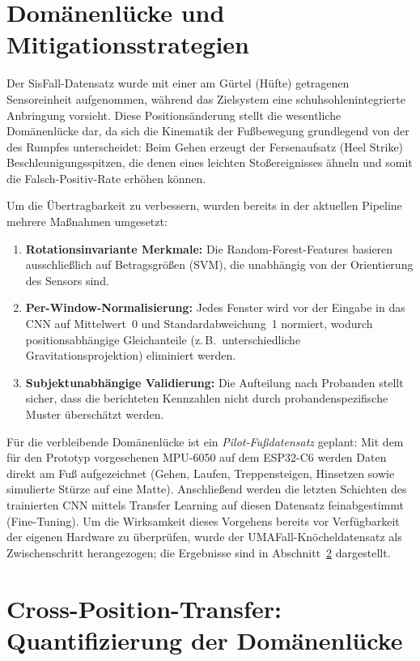\documentclass[11pt,a4paper,oneside]{report}
\begin{document}
\section{Domänenlücke und Mitigationsstrategien}
\label{sec:domain}

Der SisFall-Datensatz wurde mit einer am Gürtel (Hüfte) getragenen
Sensoreinheit aufgenommen, während das Zielsystem eine
schuhsohlenintegrierte Anbringung vorsieht. Diese Positionsänderung
stellt die wesentliche Domänenlücke dar, da sich die Kinematik der
Fußbewegung grundlegend von der des Rumpfes unterscheidet: Beim Gehen
erzeugt der Fersenaufsatz (Heel Strike) Beschleunigungsspitzen, die
denen eines leichten Stoßereignisses ähneln und somit die
Falsch-Positiv-Rate erhöhen können.

Um die Übertragbarkeit zu verbessern, wurden bereits in der aktuellen
Pipeline mehrere Maßnahmen umgesetzt:

\begin{enumerate}
\item \textbf{Rotationsinvariante Merkmale:} Die Random-Forest-Features
      basieren ausschließlich auf Betragsgrößen (\ac{SVM}), die
      unabhängig von der Orientierung des Sensors sind.
\item \textbf{Per-Window-Normalisierung:} Jedes Fenster wird vor der
      Eingabe in das CNN auf Mittelwert~0 und Standardabweichung~1
      normiert, wodurch positionsabhängige Gleichanteile (z.\,B.\
      unterschiedliche Gravitationsprojektion) eliminiert werden.
\item \textbf{Subjektunabhängige Validierung:} Die Aufteilung nach
      Probanden stellt sicher, dass die berichteten Kennzahlen nicht
      durch probandenspezifische Muster überschätzt werden.
\end{enumerate}

Für die verbleibende Domänenlücke ist ein \emph{Pilot-Fußdatensatz}
geplant: Mit dem für den Prototyp vorgesehenen MPU-6050 auf dem
ESP32-C6 werden Daten direkt am Fuß aufgezeichnet (Gehen, Laufen,
Treppensteigen, Hinsetzen sowie simulierte Stürze auf eine Matte).
Anschließend werden die letzten Schichten des trainierten CNN mittels
Transfer Learning auf diesen Datensatz feinabgestimmt (Fine-Tuning).
Um die Wirksamkeit dieses Vorgehens bereits vor Verfügbarkeit der
eigenen Hardware zu überprüfen, wurde der UMAFall-Knöcheldatensatz
\cite{umafall2017} als Zwischenschritt herangezogen; die Ergebnisse
sind in Abschnitt~\ref{sec:crossposition} dargestellt.

\section{Cross-Position-Transfer: Quantifizierung der Domänenlücke}
\label{sec:crossposition}
\end{document}
